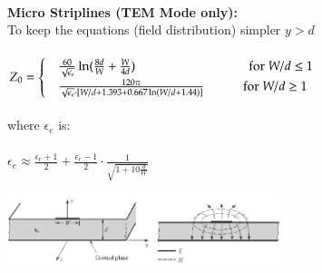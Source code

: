 \\
\begin{minipage}{6cm}
	\textbf{Micro Striplines (TEM Mode only):}\\ 
	To keep the equations (field distribution) simpler  $y > d$\\
	\\
	$Z_0 =\begin{cases}&\text{$\frac{60}{\sqrt{\epsilon_e}}\ln (\frac{8d}{W}+\frac{W}{4d})$ $\hspace{3cm}$ for $ W/d \leq 1 $}\\&\text{$\frac{120\pi}{\sqrt{\epsilon_e}\cdot [W/d + 1.393 + 0.667 \ln(W/d+1.44)]} \hspace{1cm}$ for $ W/d \geq 1 $ }\end{cases}$ \\
	\\
	where $\epsilon_e$ is:\\
	\\
	$\epsilon_e \approx \frac{\epsilon_r+1}{2}+\frac{\epsilon_r-1}{2}\cdot \frac{1}{\sqrt{1+10\frac{d}{W}}}$
	
	
\end{minipage}
\hspace{4cm}
\begin{minipage}{8cm}
	\includegraphics[width=8cm]{./images/MicroStripline.png}
\end{minipage}

\newpage